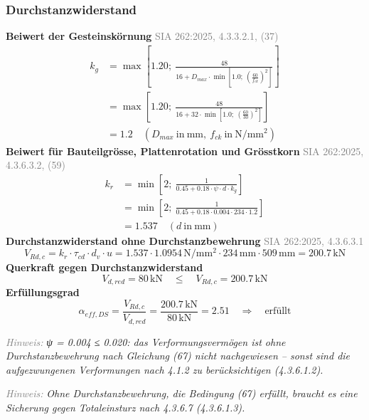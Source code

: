 \documentclass[11pt,a4paper]{article}
\newcommand{\normref}[1]{{\small\textcolor{gray}{#1}}}
\newcommand{\hinweis}[2]{\par\noindent\textcolor{gray}{\textit{#1:}} \textit{#2}\par}
\begin{document}
\subsubsection{Durchstanzwiderstand}
\noindent\textbf{Beiwert der Gesteinskörnung} \hfill \normref{SIA 262:2025, 4.3.3.2.1, (37)}
\begin{equation*}
\begin{aligned}
  k_g &= \max\left[1.20;\ \frac{48}{16 + D_{max} \cdot \min\left[1.0;\ \left(\frac{60}{f_{ck}}\right)^{2}\right]}\right] \\
  &= \max\left[1.20;\ \frac{48}{16 + 32 \cdot \min\left[1.0;\ \left(\frac{60}{30}\right)^{2}\right]}\right] \\
  &= 1.2 \quad \left(D_{max}\ \text{in}\ \mathrm{mm},\ f_{ck}\ \text{in}\ \mathrm{N}/\mathrm{mm}^{2}\right)
\end{aligned}
\end{equation*}
\noindent\textbf{Beiwert für Bauteilgrösse, Plattenrotation und Grösstkorn} \hfill \normref{SIA 262:2025, 4.3.6.3.2, (59)}
\begin{equation*}
\begin{aligned}
  k_r &= \min\left[2;\ \frac{1}{0.45 + 0.18 \cdot \psi \cdot d \cdot k_g}\right] \\
  &= \min\left[2;\ \frac{1}{0.45 + 0.18 \cdot 0.004 \cdot 234 \cdot 1.2}\right] \\
  &= 1.537 \quad \left(d\ \text{in}\ \mathrm{mm}\right)
\end{aligned}
\end{equation*}
\noindent\textbf{Durchstanzwiderstand ohne Durchstanzbewehrung} \hfill \normref{SIA 262:2025, 4.3.6.3.1}
\begin{equation*}
V_{Rd,c} = k_r \cdot \tau_{cd} \cdot d_v \cdot u = 1.537 \cdot 1.0954\,\mathrm{N}/\mathrm{mm}^{2} \cdot 234\,\mathrm{mm} \cdot 509\,\mathrm{mm} = 200.7\,\mathrm{kN}
\end{equation*}
\noindent\textbf{Querkraft gegen Durchstanzwiderstand}
\begin{equation*}
V_{d,red} = 80\,\mathrm{kN} \quad \le \quad V_{Rd,c} = 200.7\,\mathrm{kN}
\end{equation*}
\noindent\textbf{Erfüllungsgrad}
\begin{equation*}
\alpha_{eff,DS} = \frac{V_{Rd,c}}{V_{d,red}} = \frac{200.7\,\mathrm{kN}}{80\,\mathrm{kN}} = 2.51 \quad \Rightarrow \quad \text{erfüllt}
\end{equation*}
\hinweis{Hinweis}{ψ = 0.004 ≤ 0.020: das Verformungsvermögen ist ohne Durchstanzbewehrung nach Gleichung (67) nicht nachgewiesen -- sonst sind die aufgezwungenen Verformungen nach 4.1.2 zu berücksichtigen (4.3.6.1.2).}
\hinweis{Hinweis}{Ohne Durchstanzbewehrung, die Bedingung (67) erfüllt, braucht es eine Sicherung gegen Totaleinsturz nach 4.3.6.7 (4.3.6.1.3).}
\end{document}
